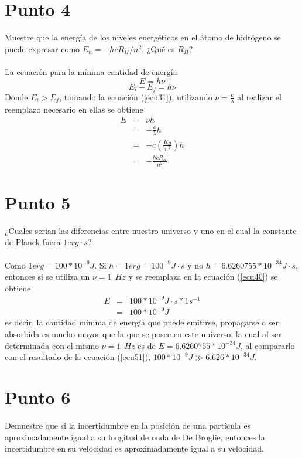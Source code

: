 \documentclass[11pt,graphicx,caption,rotating]{article}
\begin{document}
\section{Punto 4}
\noindent
Muestre que la energía de los niveles energéticos en el átomo de hidrógeno se puede expresar como $E_n=-hcR_H / n^2$. ¿Qué es $R_H$?\\\\
La ecuación para la mínima cantidad de energía
\begin{equation}
 E=h\nu
\label{ecu40}
\end{equation}
\begin{equation}
 E_i - E_f = h \nu
\label{ecu41}
\end{equation}
\noindent
Donde $E_i > E_f$, tomando la ecuación (\ref{ecu31}), utilizando $\nu = \frac{c}{\lambda}$ al realizar el reemplazo necesario en ellas se obtiene
\begin{eqnarray}
 E & = & \nu h \nonumber \\
 & = & -\frac{c}{\lambda} h \nonumber \\
 & = & -c \left( \frac{R_H}{n^2}\right) h \nonumber \\
 & = & -\frac{h c R_H}{n^2} \label{ecu42}
\end{eqnarray}

\section{Punto 5}
\noindent
¿Cuales serian las diferencias entre nuestro universo y uno en el cual la constante de Planck fuera $1 erg \cdotp s$?\\\\
Como $1 erg=100*10^{-9} J$. Si $h=1 erg= 100^{-9} J\cdotp s$ y no $h=6.6260755*10^{-34} J\cdotp s$, entonces si se utiliza un $\nu = 1\ \ Hz$ y se reemplaza en la ecuación (\ref{ecu40}) se obtiene
\begin{eqnarray}
 E & = & 100*10^{-9}J\cdotp s* 1s^{-1}\nonumber \\
 & = & 100*10^{-9}J \label{ecu51}
\end{eqnarray}
\noindent
es decir, la cantidad mínima de energía que puede emitirse, propagarse o ser absorbida es mucho mayor que la que se posee en este universo, la cual al ser determinada con el mismo $\nu=1\ \ Hz$ es de $E=6.6260755*10^{-34}J$, al compararlo con el resultado de la ecuación (\ref{ecu51}), $100*10^{-9}J \gg 6.626*10^{-34}J$.

\section{Punto 6}
\noindent
Demuestre que si la incertidumbre en la posición de una partícula es aproximadamente igual a su longitud de onda de De Broglie, entonces la incertidumbre en su velocidad es aproximadamente igual a su velocidad.
\end{document}
